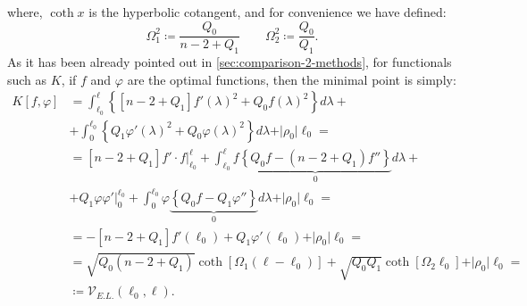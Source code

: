 where, \(\coth x\) is the hyperbolic cotangent, and for convenience we have defined:
\[
\Omega_1^2 \coloneqq \frac{Q_0}{n - 2 + Q_1} \quad \quad  \Omega_2^2 \coloneqq \frac{Q_0}{Q_1}.
\]
As it has been already pointed out in \ref{sec:comparison-2-methods}, for functionals such as \(K\), if \(f\) and \(\varphi\) are the optimal functions, then the minimal point is simply:
\begin{align*}
    K[f, \varphi] &= \int_{\ell_0}^{\ell}\left\{\left[n - 2 + Q_1\right] f'(\lambda)^2  + Q_0 f(\lambda)^2\right\}d\lambda + \\
    &+\int_{0}^{\ell_0}\left\{Q_1 \varphi'(\lambda)^2  + Q_0 \varphi(\lambda)^2\right\}d\lambda + \vert\rho_0\vert\ell_0 = \\
    &= \left[n - 2 + Q_1\right] f'\cdot f\Big\vert_{\ell_0}^{\ell} + \int_{\ell_0}^{\ell} f\underbrace{\left\{Q_0f - \left(n - 2 + Q_1\right)f''\right\}}_{0} d\lambda + \\ &+ Q_1\varphi\varphi'\Big\vert_0^{\ell_0} + \int_{0}^{\ell_0} \varphi\underbrace{\left\{Q_0f -  Q_1\varphi''\right\}}_{0} d\lambda + \vert\rho_0\vert\ell_0 =\\
    &=-\left[n - 2 + Q_1\right] f'(\ell_0) +Q_1\varphi'(\ell_0) + \vert\rho_0\vert\ell_0 = \\
    &= \sqrt{Q_0(n - 2 + Q_1)}\coth\left[\Omega_1(\ell- \ell_0)\right] + \sqrt{Q_0Q_1}\coth\left[\Omega_2\ell_0\right] + \vert \rho_0\vert\ell_0 = \\
    &\coloneqq \mathcal{V}_{E.L.}(\ell_0, \ell).
\end{align*}

